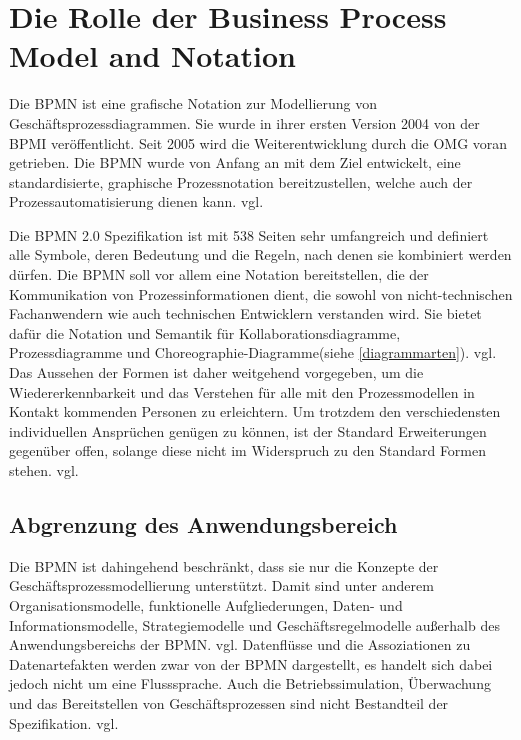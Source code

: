 \section{Die Rolle der Business Process Model and Notation}

Die  \ac{BPMN} ist eine grafische Notation zur Modellierung von Geschäftsprozessdiagrammen. Sie wurde in ihrer ersten Version 2004 von der \ac{BPMI} veröffentlicht. Seit 2005 wird die Weiterentwicklung durch die \ac{OMG} voran getrieben. Die \ac{BPMN} wurde von Anfang an mit dem Ziel entwickelt, eine standardisierte, graphische Prozessnotation bereitzustellen, welche auch der Prozessautomatisierung dienen kann. vgl.\cite[S. 8+9]{Freund.2010}

Die \ac{BPMN} 2.0 Spezifikation ist mit 538 Seiten sehr umfangreich und definiert alle Symbole, deren  Bedeutung und die Regeln, nach denen sie kombiniert werden dürfen. \cite{ObjectManagementGroup.2011}
Die \ac{BPMN} soll vor allem eine Notation bereitstellen, die der Kommunikation von Prozessinformationen dient, die sowohl von nicht-technischen Fachanwendern wie auch technischen Entwicklern verstanden wird. Sie bietet dafür die Notation und Semantik für Kollaborationsdiagramme, Prozessdiagramme und Choreographie-Diagramme(siehe \ref{diagrammarten}). vgl.\cite[S.1]{ObjectManagementGroup.2011}
Das Aussehen der Formen ist daher weitgehend vorgegeben, um die Wiedererkennbarkeit und das Verstehen für alle mit den Prozessmodellen in Kontakt kommenden Personen zu erleichtern. Um trotzdem den verschiedensten individuellen Ansprüchen genügen zu können, ist der Standard Erweiterungen gegenüber offen, solange diese nicht im Widerspruch zu den Standard Formen stehen. vgl.\cite[S.8]{ObjectManagementGroup.2011}

\subsection{Abgrenzung des Anwendungsbereich}
Die \ac{BPMN} ist dahingehend beschränkt, dass sie nur die Konzepte der Geschäftsprozessmodellierung unterstützt. Damit sind unter anderem Organisationsmodelle, funktionelle Aufgliederungen, Daten- und Informationsmodelle, Strategiemodelle und Geschäftsregelmodelle außerhalb des Anwendungsbereichs der \ac{BPMN}. vgl.\cite[S.22]{ObjectManagementGroup.2011}
Datenflüsse und die Assoziationen zu Datenartefakten werden zwar von der \ac{BPMN} dargestellt, es handelt sich dabei jedoch nicht um eine Flusssprache. Auch die Betriebssimulation, Überwachung und das Bereitstellen von Geschäftsprozessen sind nicht Bestandteil der Spezifikation. vgl.\cite[S.22]{ObjectManagementGroup.2011} 



